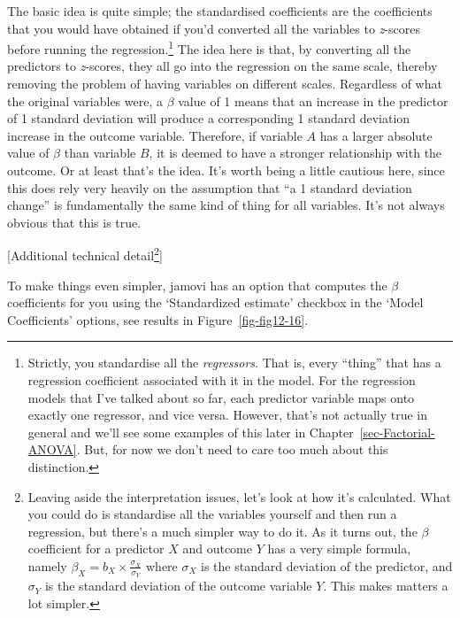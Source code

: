 \documentclass[
  a4paper,
]{book}
\begin{document}
The basic idea is quite simple; the standardised coefficients are the
coefficients that you would have obtained if you'd converted all the
variables to \emph{z}-scores before running the regression.\footnote{Strictly,
  you standardise all the \emph{regressors}. That is, every ``thing''
  that has a regression coefficient associated with it in the model. For
  the regression models that I've talked about so far, each predictor
  variable maps onto exactly one regressor, and vice versa. However,
  that's not actually true in general and we'll see some examples of
  this later in Chapter~\ref{sec-Factorial-ANOVA}. But, for now we don't
  need to care too much about this distinction.} The idea here is that,
by converting all the predictors to \emph{z}-scores, they all go into
the regression on the same scale, thereby removing the problem of having
variables on different scales. Regardless of what the original variables
were, a \(\beta\) value of 1 means that an increase in the predictor of
1 standard deviation will produce a corresponding 1 standard deviation
increase in the outcome variable. Therefore, if variable \(A\) has a
larger absolute value of \(\beta\) than variable \(B\), it is deemed to
have a stronger relationship with the outcome. Or at least that's the
idea. It's worth being a little cautious here, since this does rely very
heavily on the assumption that ``a 1 standard deviation change'' is
fundamentally the same kind of thing for all variables. It's not always
obvious that this is true.

{[}Additional technical detail\footnote{Leaving aside the interpretation
  issues, let's look at how it's calculated. What you could do is
  standardise all the variables yourself and then run a regression, but
  there's a much simpler way to do it. As it turns out, the \(\beta\)
  coefficient for a predictor \(X\) and outcome \(Y\) has a very simple
  formula, namely \(\beta_X=b_X \times \frac{\sigma_X}{\sigma_Y}\) where
  \(\sigma_X\) is the standard deviation of the predictor, and
  \(\sigma_Y\) is the standard deviation of the outcome variable \(Y\).
  This makes matters a lot simpler.}{]}

To make things even simpler, jamovi has an option that computes the
\(\beta\) coefficients for you using the `Standardized estimate'
checkbox in the `Model Coefficients' options, see results in
Figure~\ref{fig-fig12-16}.
\end{document}
